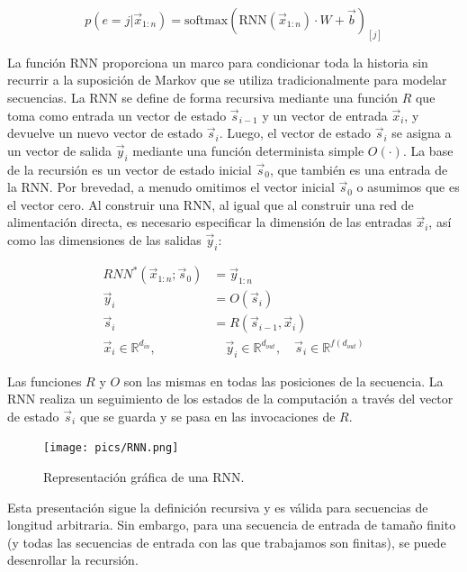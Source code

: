 \begin{displaymath}
p(e = j|\vec{x}_{1:n}) = \text{softmax}(\text{RNN}(\vec{x}_{1:n})\cdot W +\vec{b})_{[j]}
\end{displaymath}

La función RNN proporciona un marco para condicionar toda la historia sin recurrir a la suposición de Markov que se utiliza tradicionalmente para modelar secuencias. La RNN se define de forma recursiva mediante una función $R$ que toma como entrada un vector de estado $\vec{s}_{i-1}$ y un vector de entrada $\vec{x}_{i}$, y devuelve un nuevo vector de estado $\vec{s}_i$. Luego, el vector de estado $\vec{s}_i$ se asigna a un vector de salida $\vec{y}_i$ mediante una función determinista simple $O(\cdot)$. La base de la recursión es un vector de estado inicial $\vec{s}_{0}$, que también es una entrada de la RNN. Por brevedad, a menudo omitimos el vector inicial $\vec{s}_{0}$ o asumimos que es el vector cero. Al construir una RNN, al igual que al construir una red de alimentación directa, es necesario especificar la dimensión de las entradas $\vec{x}_i$, así como las dimensiones de las salidas $\vec{y}_i$:

\begin{equation}
\begin{split}
RNN^{*}(\vec{x}_{1:n};\vec{s}_0) & = \vec{y}_{1:n} \\
\vec{y}_i & = O(\vec{s}_i) \\
\vec{s}_i & = R(\vec{s}_{i-1},\vec{x}_i) \\
\vec{x}_i \in \mathbb{R}^{d_{in}}, & \quad \vec{y}_i \in \mathbb{R}^{d_{out}}, \quad \vec{s}_i \in \mathbb{R}^{f(d_{out})}
\end{split}
\end{equation}

Las funciones $R$ y $O$ son las mismas en todas las posiciones de la secuencia. La RNN realiza un seguimiento de los estados de la computación a través del vector de estado $\vec{s}_i$ que se guarda y se pasa en las invocaciones de $R$.

\begin{figure}[h]
  \centering
  \texttt{[image: pics/RNN.png]}
  \caption{Representación gráfica de una RNN.}
\end{figure}

Esta presentación sigue la definición recursiva y es válida para secuencias de longitud arbitraria. Sin embargo, para una secuencia de entrada de tamaño finito (y todas las secuencias de entrada con las que trabajamos son finitas), se puede desenrollar la recursión.

